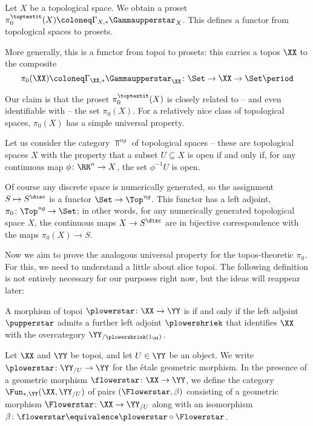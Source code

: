 \begin{exm}
	Let $ X $ be a topological space.
	We obtain a proset $ \pi^{\toptextit}_0(X) \coloneq \Gamma_{X, \ast}\Gammaupperstar_X $.
	This defines a functor from topological spaces to prosets.

	More generally, this is a functor from topoi to prosets:
	this carries a topos $ \XX $ to the composite
	\[
		\pi_0(\XX) \coloneq \Gamma_{\XX, \ast} \Gammaupperstar_{\XX} \colon \Set \to \XX \to \Set \period
	\]
\end{exm}

Our claim is that the proset $ \pi_0^{\toptextit}(X) $ is closely related to -- and even identifiable with -- the set $ \pi_0(X) $.
For a relatively nice class of topological spaces, $ \pi_0(X) $ has a simple universal property.

\begin{nul}
	Let us consider the category $ \Top^{\textit{ng}} $ of  topological spaces -- these are topological spaces $ X $ with the property that a subset $ U \subseteq X $ is open if and only if, for any continuous map $ \phi \colon \RR^n \to X $, the set $ \phi^{-1} U $ is open.
	
	Of course any discrete space is numerically generated, so the assignment $ S \mapsto S^{\disc} $ is a functor $ \Set \to \Top^{\textit{ng}} $.
	This functor has a left adjoint, $ \pi_0 \colon \Top^{\textit{ng}} \to \Set $;
	in other words, for any numerically generated topological space $ X $, the continuous maps $ X \to S^{\disc} $ are in bijective correspondence with the maps $ \pi_0(X) \to S $.
\end{nul}

Now we aim to prove the analogous universal property for the topos-theoretic $\pi_0 $.
For this, we need to understand a little about slice topoi.
The following definition is not entirely necessary for our purposes right now, but the ideas will reappear later:
\begin{dfn}
	A morphism of topoi $ \plowerstar \colon \XX \to \YY $ is  if and only if the left adjoint $ \pupperstar $ admits a further left adjoint $ \plowershriek $ that identifies $ \XX $ with the overcategory $ \YY_{/\plowershriek(1_{\XX})} $.
\end{dfn}

\begin{ntn}
	Let $ \XX $ and $ \YY $ be topoi, and let $ U \in \YY $ be an object.
	We write $ \plowerstar \colon \YY_{/U} \to \YY $ for the étale geometric morphism.
	In the presence of a geometric morphism $ \flowerstar \colon \XX \to \YY $, we define the category $ \Fun_{\ast,\YY}(\XX, \YY_{/U}) $ of pairs $ (\Flowerstar, \beta) $ consisting of a geometric morphism $ \Flowerstar \colon \XX \to \YY_{/U} $ along with an isomorphism $ \beta \colon \flowerstar \equivalence \plowerstar \circ \Flowerstar $.
\end{ntn}

